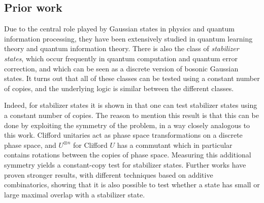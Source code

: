\documentclass[11pt,a4paper]{article}
\numberwithin{equation}{section}
\newcommand{\ot}{\otimes}
\newcommand{\1}{\mathbf{1}}
\begin{document}
\subsection{Prior work}\label{sec:related-work}
Due to the central role played by Gaussian states in physics and quantum information processing, they have been extensively studied in quantum learning theory and quantum information theory. There is also the class of \emph{stabilizer states}, which occur frequently in quantum computation and quantum error correction, and which can be seen as a discrete version of bosonic Gaussian states. It turns out that all of these classes can be tested using a constant number of copies, and the underlying logic is similar between the different classes.

Indeed, for stabilizer states it is shown in \cite{gross2021schur} that one can test stabilizer states using a constant number of copies.
The reason to mention this result is that this can be done by exploiting the symmetry of the problem, in a way closely analogous to this work. Clifford unitaries act as phase space transformations on a discrete phase space, and $U^{\ot n}$ for Clifford $U$ has a commutant which in particular contains rotations between the copies of phase space. Measuring this additional symmetry yields a constant-copy test for stabilizer states. Further works \cite{arunachalam2025polynomial,bao2025tolerant, MehrabanTahmasbi:2025} have proven stronger results, with different techniques based on additive combinatorics, showing that it is also possible to test whether a state has small or large maximal overlap with a stabilizer state.
\end{document}
